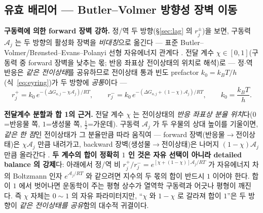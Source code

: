 \documentclass[11pt,a4paper]{article}
\begin{document}
\subsection{유효 배리어 — Butler--Volmer 방향성 장벽 이동}
\textbf{구동력에 의한 forward 장벽 강하.} 정/역 두 방향(\S\ref{sec:lag} 의 $r_j^\pm$)을 보면, 구동력 $\mathcal A_j$ 는
두 방향의 활성화 장벽을 \emph{비대칭}으로 옮긴다 — 표준 Butler--Volmer/Brønsted--Evans--Polanyi 선형 자유에너지
관계다 \cite{bardfaulkner,evanspolanyi1938}. 전달 계수 $\chi\in[0,1]$(구동력 중 forward 장벽을 낮추는 몫; 반응
좌표상 전이상태의 위치로 해석)로 — 정$\cdot$역 반응은 \emph{같은 전이상태}를 공유하므로 전이상태 통과 빈도
prefactor $k_0=k_BT/h$(식~\eqref{eq:eyring})가 두 방향에 \emph{공통}이다 —
\begin{equation}
r_j^+=k_0\,e^{-(\Delta G_{a,j}-\chi\mathcal A_j)/RT},\qquad
r_j^-=k_0\,e^{-(\Delta G_{a,j}+(1-\chi)\mathcal A_j)/RT},\qquad k_0=\frac{k_BT}{h}.
\label{eq:bv}
\end{equation}

\textbf{전달계수 분할과 합 1의 근거.} 전달 계수 $\chi$ 는 전이상태의 \emph{반응 좌표상 분율
위치}다($0$=반응물 쪽, $1$=생성물 쪽, $\tfrac12$=가운데). 구동력 $\mathcal A_j$ 가 두 우물의 상대 높이를
기울이면, \emph{같은 한 점}인 전이상태가 그 분율만큼 따라 움직여 — forward 장벽(반응물$\to$전이상태)은
$\chi\mathcal A_j$ 만큼 내려가고, backward 장벽(생성물$\to$전이상태)은 나머지 $(1-\chi)\mathcal A_j$ 만큼 올라간다
\cite{evanspolanyi1938,bardfaulkner}. \textbf{두 계수의 합이 정확히 $1$ 인 것은 자유 선택이 아니라 detailed
balance 의 강제}다: 아래에서 정/역 비 $r_j^+/r_j^-=e^{[\chi+(1-\chi)]\mathcal A_j/RT}$ 가 자유에너지 차의
Boltzmann 인자 $e^{\mathcal A_j/RT}$ 와 같으려면 지수의 두 몫의 합이 반드시 $1$ 이어야 한다. 합이 $1$ 에서
벗어나면 운동학이 주는 평형 상수가 열역학 구동력과 어긋나 평형이 깨진다. 즉 $\chi$ 자체는 $0\!\sim\!1$ 의 자유
파라미터지만, ``$\chi$ 와 $1-\chi$ 로 갈라져 합이 $1$''은 두 방향이 \emph{같은 전이상태를 공유}함의 대수적
귀결이다.
\end{document}
